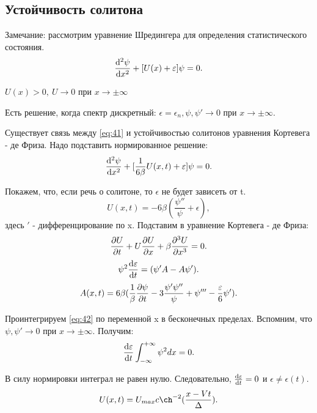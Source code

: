 \subsection{Устойчивость солитона}
Замечание: рассмотрим уравнение Шредингера для определения статистического состояния. 
\begin{equation}
	\dv[2]{\psi}{x}+[U(x)+\varepsilon]\psi=0.
	\label{eq:42}
\end{equation}

$U(x)>0, ~U\rightarrow 0$ при $x\rightarrow \pm \infty$

Есть решение, когда спектр дискретный: $\epsilon=\epsilon_n, \psi, \psi' \rightarrow 0$ при $x\rightarrow \pm \infty$.\

Существует связь между \eqref{eq:41} и устойчивостью солитонов уравнения Кортевега - де Фриза. Надо подставить нормированное решение:
\begin{equation*}
	\dv[2]{\psi}{x}+[\frac{1}{6\beta}U(x,t)+\varepsilon]\psi=0.
\end{equation*}

Покажем, что, если речь о солитоне, то $\epsilon$ не будет зависеть от t.
\begin{equation*}
	U(x,t)=-6\beta(\frac{\psi''}{\psi}+\epsilon),
\end{equation*}
здесь $'$ - дифференцирование по x. Подставим в уравнение Кортевега - де Фриза:
\begin{equation*}
	\pdv{U}{t}+U\pdv{U}{x}+\beta \pdv[3]{U}{x}=0.
\end{equation*}
\begin{equation}
	\psi^2\dv{\varepsilon}{t}=(\psi'A-A\psi').
	\label{eq:43}
\end{equation}
\begin{equation*}
	A(x,t)=6\beta(\frac1{\beta}\pdv{\psi}{t}-3\frac{\psi'\psi''}{\psi}+\psi'''-\frac{\varepsilon}{6}\psi').
\end{equation*}

Проинтегрируем \eqref{eq:42} по переменной x в бесконечных пределах. Вспомним, что $\psi, \psi' \rightarrow 0$ при $x\rightarrow \pm \infty$. Получим:
\begin{equation*}
	\dv{\varepsilon}{t}\int^{+\infty}_{-\infty}\psi^2dx=0.
\end{equation*}

В силу нормировки интеграл не равен нулю. Следовательно, $\dv{\varepsilon}{t}=0$ и $\epsilon\neq \epsilon(t)$.
\begin{equation*}
	U(x,t)=U_{max}c\ch^{-2}(\frac{x-Vt}{\Delta}).
\end{equation*}

